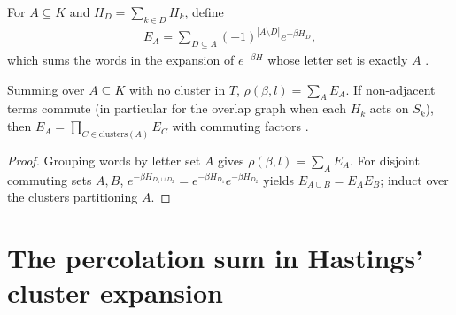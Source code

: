 \begin{definition}
    \label{def:hastings_cluster_operator}
    \leanok
    For $A\subseteq K$ and $H_D=\sum_{k\in D}H_k$, define
    \begin{align}
        E_A=\sum_{D\subseteq A}(-1)^{|A\setminus D|}e^{-\beta H_D},
        \label{eq:hastings_cluster_operator}
    \end{align}
    which sums the words in the expansion of $e^{-\beta H}$ whose letter set is
    exactly $A$ \cite[lines 1268--1269]{Hastings2006Solving}.
\end{definition}

\begin{lemma}
    \label{thm:hastings_truncation_cluster_products}
    \leanok
    Summing over $A\subseteq K$ with no cluster in $T$,
    $\rho(\beta,l)=\sum_AE_A$. If non-adjacent terms commute (in particular for
    the overlap graph when each $H_k$ acts on $S_k$), then
    $E_A=\prod_{C\in\mathrm{clusters}(A)}E_C$ with commuting factors
    \cite[lines 1108--1110]{Hastings2006Solving}.
\end{lemma}
\begin{proof}
    \leanok
    Grouping words by letter set $A$ gives $\rho(\beta,l)=\sum_AE_A$. For
    disjoint commuting sets $A,B$,
    $e^{-\beta H_{D_1\cup D_2}}=e^{-\beta H_{D_1}}e^{-\beta H_{D_2}}$ yields
    $E_{A\cup B}=E_AE_B$; induct over the clusters partitioning $A$.
\end{proof}

\section{The percolation sum in Hastings' cluster expansion}
\label{sec:hastings_percolation}

